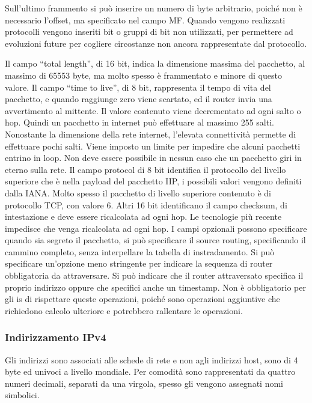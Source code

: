 \documentclass{article}
\numberwithin{equation}{subsection}
\begin{document}
Sull'ultimo frammento si può inserire un numero di byte arbitrario, poiché non è necessario l'offset, ma specificato nel campo MF. 
Quando vengono realizzati protocolli vengono inseriti bit o gruppi di bit non utilizzati, per permettere ad evoluzioni future per cogliere circostanze non ancora 
rappresentate dal protocollo. 

Il campo ``total length'', di 16 bit, indica la dimensione massima del pacchetto, al massimo di 65553 byte, ma molto spesso è frammentato e minore di questo valore. 
Il campo ``time to live'', di 8 bit, rappresenta il tempo di vita del pacchetto, e quando raggiunge zero viene scartato, ed il router invia una avvertimento al mittente. 
Il valore contenuto viene decrementato ad ogni salto o hop. Quindi un pacchetto in internet può effettuare al massimo 255 salti. Nonostante la dimensione della rete 
internet, l'elevata connettività permette di effettuare pochi salti. Viene imposto un limite per impedire che alcuni pacchetti entrino in loop. Non deve essere possibile 
in nessun caso che un pacchetto giri in eterno sulla rete. 
Il campo protocol di 8 bit identifica il protocollo del livello superiore che è nella payload del pacchetto IIP, i possibili valori vengono definiti dalla IANA. Molto 
spesso il pacchetto di livello superiore contenuto è di protocollo TCP, con valore 6. 
Altri 16 bit identificano il campo checksum, di intestazione e deve essere ricalcolata ad ogni hop. Le tecnologie più recente impedisce che venga ricalcolata ad ogni hop. 
I campi opzionali possono specificare quando sia segreto il pacchetto, si può specificare il source routing, specificando il cammino completo, senza interpellare la 
tabella di instradamento. Si può specificare un'opzione meno stringente per indicare la sequenza di router obbligatoria da attraversare. Si può indicare che il 
router attraversato specifica il proprio indirizzo oppure che specifici anche un timestamp. Non è obbligatorio per gli is di rispettare queste operazioni, poiché sono 
operazioni aggiuntive che richiedono calcolo ulteriore e potrebbero rallentare le operazioni. 

\subsubsection{Indirizzamento IPv4}

Gli indirizzi sono associati alle schede di rete e non agli indirizzi host, sono di 4 byte ed univoci a livello mondiale. Per comodità 
sono rappresentati da quattro numeri decimali, separati da una virgola, spesso gli vengono assegnati nomi simbolici. 
\end{document}
